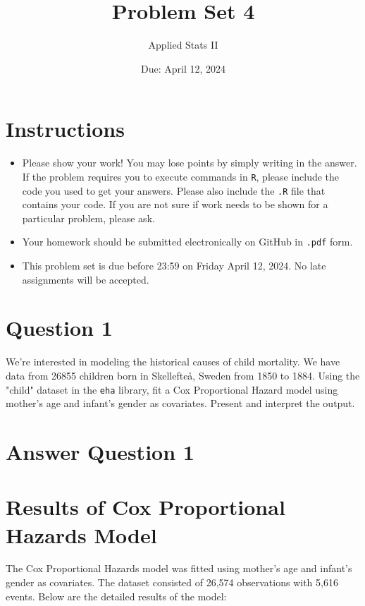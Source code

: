 \documentclass[12pt,letterpaper]{article}
\title{Problem Set 4}
\date{Due: April 12, 2024}
\author{Applied Stats II}
\begin{document}
	\maketitle
	\section*{Instructions}
	\begin{itemize}
	\item Please show your work! You may lose points by simply writing in the answer. If the problem requires you to execute commands in \texttt{R}, please include the code you used to get your answers. Please also include the \texttt{.R} file that contains your code. If you are not sure if work needs to be shown for a particular problem, please ask.
	\item Your homework should be submitted electronically on GitHub in \texttt{.pdf} form.
	\item This problem set is due before 23:59 on Friday April 12, 2024. No late assignments will be accepted.

	\end{itemize}

	\vspace{.25cm}
\section*{Question 1}
\vspace{.25cm}
\noindent We're interested in modeling the historical causes of child mortality. We have data from 26855 children born in Skellefteå, Sweden from 1850 to 1884. Using the "child" dataset in the \texttt{eha} library, fit a Cox Proportional Hazard model using mother's age and infant's gender as covariates. Present and interpret the output.

\section*{Answer Question 1}


\section*{Results of Cox Proportional Hazards Model}

The Cox Proportional Hazards model was fitted using mother's age and infant's gender as covariates. The dataset consisted of 26,574 observations with 5,616 events. Below are the detailed results of the model:
\end{document}

